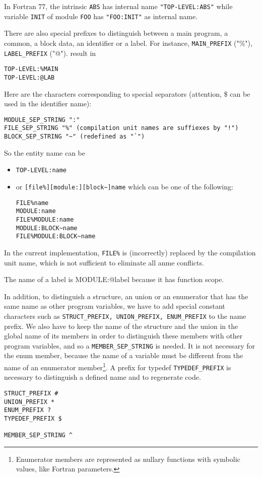 \documentclass[a4paper]{report}
\begin{document}
In Fortran 77, the intrinsic \verb/ABS/ has internal name
\verb/"TOP-LEVEL:ABS"/ while variable \verb/INIT/ of module \verb/FOO/
has \verb/"FOO:INIT"/ as internal name.

There are also special prefixes to distinguish between a main program,
a common, a block data, an identifier or a label. For instance,
\verb/MAIN_PREFIX/ ("\%"), \verb/LABEL_PREFIX/ ("@"). result in
\begin{verbatim}
TOP-LEVEL:%MAIN
TOP-LEVEL:@LAB
\end{verbatim}

Here are the characters corresponding to special separators (attention, \$
can be used in the identifier name): 
\begin{verbatim}
MODULE_SEP_STRING ":"
FILE_SEP_STRING "%" (compilation unit names are suffiexes by "!")
BLOCK_SEP_STRING "~" (redefined as "`")
\end{verbatim}  

So the entity name can be 
\begin{itemize}
\item 
\verb/TOP-LEVEL:name/
\item or 
\verb/[file%][module:][block~]name/ which can be one of the following: 
\begin{verbatim}
FILE%name
MODULE:name
FILE%MODULE:name
MODULE:BLOCK~name
FILE%MODULE:BLOCK~name
\end{verbatim}  
\end{itemize} 
In the current implementation, \verb/FILE%/ is (incorrectly) replaced
 by the compilation unit name, which is not sufficient to eliminate
 all anme conflicts.

The name of a label is MODULE:@label because it has function scope. 

In addition, to distinguish a structure, an union or an enumerator
that has the same name as other program variables, we have to add
special constant characters such as
\verb/STRUCT_PREFIX, UNION_PREFIX, ENUM_PREFIX/ to the name prefix. We
also have to keep the name of the structure and the union in the
global name of its members in order to distinguish these members with
other program variables, and so a \verb/MEMBER_SEP_STRING/ is needed.
It is not necessary for the enum member, because the name of a
variable must be different from the name of an enumerator
member\footnote{Enumerator members are represented as nullary
  functions with symbolic values, like Fortran parameters.}.  A prefix
for typedef \verb/TYPEDEF_PREFIX/ is necessary to distinguish a
defined name and to regenerate code.
\begin{verbatim}
STRUCT_PREFIX #
UNION_PREFIX *
ENUM_PREFIX ?
TYPEDEF_PREFIX $

MEMBER_SEP_STRING ^
\end{verbatim}
\end{document}
